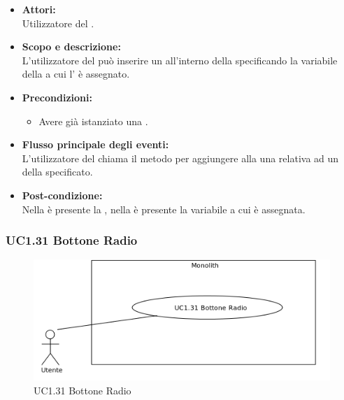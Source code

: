 \begin{itemize}
	\item \textbf{Attori:}
	\\Utilizzatore del .
	\item \textbf{Scopo e descrizione:} 
	\\L'utilizzatore del  può inserire un   all'interno della  specificando la variabile della  a cui l' è assegnato.
	\item \textbf{Precondizioni:}
	\begin{itemize}
		\item Avere già istanziato una .
	\end{itemize}
	\item \textbf{Flusso principale degli eventi:}
	\\L'utilizzatore del  chiama il metodo per aggiungere alla  una  relativa ad un  della  specificato.
	\item \textbf{Post-condizione:}
	\\Nella {} è presente la , nella  è presente la variabile a cui è assegnata.
\end{itemize}

\subsubsection{UC1.31 Bottone Radio} \label{UC1.31}

\begin{figure}[H]
	\centering
	\includegraphics[width=15cm]{../../documenti/AnalisiDeiRequisiti/Diagrammi_img/uc1_31.png}
	\caption{UC1.31 Bottone Radio}
\end{figure}

